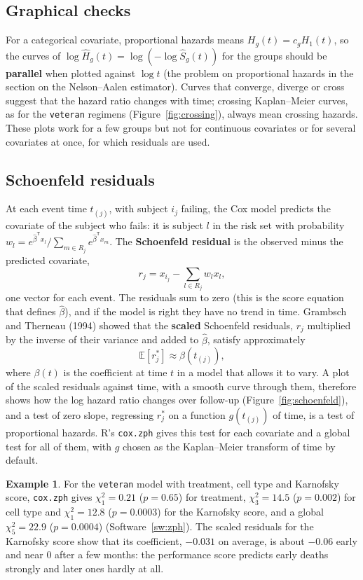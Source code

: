 \documentclass[11pt,a4paper]{article}
\numberwithin{equation}{section}
\theoremstyle{definition}
\newtheorem{exa}[thm]{Example}
\begin{document}
\subsection{Graphical checks}
\label{ssec:phplots}

For a categorical covariate, proportional hazards means $H_g(t) = c_gH_1(t)$, so the curves of $\log\hat H_g(t) = \log(-\log\hat S_g(t))$ for the groups should be \textbf{parallel} when plotted against $\log t$ (the problem on proportional hazards in the section on the Nelson--Aalen estimator). Curves that converge, diverge or cross suggest that the hazard ratio changes
with time; crossing Kaplan--Meier curves, as for the \texttt{veteran} regimens (Figure~\ref{fig:crossing}), always mean crossing hazards. These plots work for a few groups but not for continuous covariates or for several covariates at once, for which residuals are used.

\subsection{Schoenfeld residuals}
\label{ssec:schoenfeld}

At each event time $t_{(j)}$, with subject $i_j$ failing, the Cox model predicts the covariate of the subject who fails: it is subject $l$ in the risk set with probability $w_l = e^{\hat\beta^{\mathsf T}x_l}/\sum_{m \in R_j}e^{\hat\beta^{\mathsf T}x_m}$. The \textbf{Schoenfeld residual} is the observed minus the predicted covariate,
\[
r_j = x_{i_j} - \sum_{l \in R_j}w_lx_l ,
\]
one vector for each event. The residuals sum to zero (this is the score equation that defines $\hat\beta$), and if the model is right they have no trend in time. Grambsch and Therneau (1994) showed that the \textbf{scaled} Schoenfeld residuals, $r_j$ multiplied by the inverse of their variance and added to $\hat\beta$, satisfy approximately
\[
\mathbb E[r_j^*] \approx \beta(t_{(j)}) ,
\]
where $\beta(t)$ is the coefficient at time $t$ in a model that allows it to vary. A plot of the scaled residuals against time, with a smooth curve through them, therefore shows how the log hazard ratio changes over follow-up (Figure~\ref{fig:schoenfeld}), and a test of zero slope, regressing $r_j^*$ on a function $g(t_{(j)})$ of time, is a test of proportional hazards.
R's \texttt{cox.zph} gives this test for each covariate and a global test for all of them, with $g$ chosen as the Kaplan--Meier transform of time by default.

\begin{exa}
\label{ex:zph}
For the \texttt{veteran} model with treatment, cell type and Karnofsky score, \texttt{cox.zph} gives $\chi^2_1 = 0.21$ ($p = 0.65$) for treatment, $\chi^2_3 = 14.5$ ($p = 0.002$) for cell type and $\chi^2_1 = 12.8$ ($p = 0.0003$) for the Karnofsky score, and a global $\chi^2_5 = 22.9$ ($p = 0.0004$) (Software~\ref{sw:zph}). The scaled residuals for the Karnofsky score
show that its coefficient, $-0.031$ on average, is about $-0.06$ early and near $0$ after a few months: the performance score predicts early deaths strongly and later ones hardly at all.
\end{exa}
\end{document}

